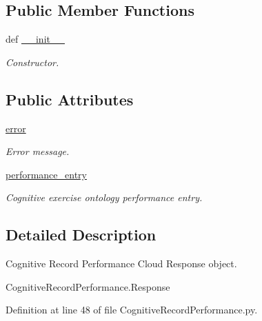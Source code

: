 \subsection*{Public Member Functions}
\begin{DoxyCompactItemize}
\item 
def \hyperlink{classRappCloud_1_1CloudMsgs_1_1CognitiveRecordPerformance_1_1CognitiveRecordPerformance_1_1Response_a9306ae78d9c263e64baedd27cb8c7251}{\-\_\-\-\_\-init\-\_\-\-\_\-}
\begin{DoxyCompactList}\small\item\em Constructor. \end{DoxyCompactList}\end{DoxyCompactItemize}
\subsection*{Public Attributes}
\begin{DoxyCompactItemize}
\item 
\hyperlink{classRappCloud_1_1CloudMsgs_1_1CognitiveRecordPerformance_1_1CognitiveRecordPerformance_1_1Response_a7479228d588578fb8e11722c7769d26a}{error}
\begin{DoxyCompactList}\small\item\em Error message. \end{DoxyCompactList}\item 
\hyperlink{classRappCloud_1_1CloudMsgs_1_1CognitiveRecordPerformance_1_1CognitiveRecordPerformance_1_1Response_a885944a9d96c427f5793b804b1c8bba8}{performance\-\_\-entry}
\begin{DoxyCompactList}\small\item\em Cognitive exercise ontology performance entry. \end{DoxyCompactList}\end{DoxyCompactItemize}


\subsection{Detailed Description}
\begin{DoxyVerb}Cognitive Record Performance Cloud Response object.

CognitiveRecordPerformance.Response
\end{DoxyVerb}
 

Definition at line 48 of file Cognitive\-Record\-Performance.\-py.



